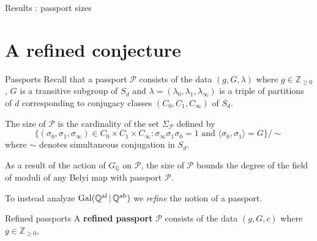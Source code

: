 \documentclass[xcolor=dvipsnames]{beamer}
\theoremstyle{plain}
\newcommand{\QQ}{\mathbb Q}
\newcommand{\ZZ}{\mathbb Z}
\newcommand{\QQal}{{\mathbb Q}^{\textup{al}}}
\newcommand{\QQab}{{\mathbb Q}^{\textup{ab}}}
\DeclareMathOperator{\Gal}{Gal}
\begin{document}
{\begin{frame}[fragile]{Results : passport sizes}
\begin{figure}[ht]
      \end{figure}
    \end{frame}
  }
  \section{A refined conjecture}{
    \begin{frame}{Passports}
      Recall that a passport $\mathcal{P}$
      consists of the data
      $(g,G,\lambda)$
      where $g\in\ZZ_{\geq 0}$,
      $G$ is a transitive subgroup of $S_d$
      and $\lambda = (\lambda_0,\lambda_1,\lambda_\infty)$
      is a triple of partitions of $d$
      corresponding to conjugacy classes $(C_0,C_1,C_\infty)$
      of $S_d$.
      \pause\par
      The size of
      $\mathcal{P}$ is the cardinality of the
      set
      $\Sigma_\mathcal{P}$
      defined by
      \[
        \Big\{
          (\sigma_0,\sigma_1,\sigma_\infty)\in C_0\times C_1\times C_\infty :
          \sigma_\infty\sigma_1\sigma_0=1
          \text{ and }
          \langle\sigma_0,\sigma_1\rangle=G
        \Big\}/\!\!\sim
      \]
      where $\sim$ denotes simultaneous conjugation in $S_d$.
      \pause\par
      As a result of the action of
      $G_\QQ$ on $\mathcal{P}$,
      the size of $\mathcal{P}$ bounds the degree of the field
      of moduli of any Belyi map with passport
      $\mathcal{P}$.
      \pause\par
      To instead analyze
      $\Gal(\QQal\,|\,\QQab)$
      we \emph{refine} the notion of a passport.
    \end{frame}
    \begin{frame}{Refined passports}
      A \textbf{refined passport} $\mathscr{P}$
      consists of the data
      $(g,G,c)$
      where $g\in\ZZ_{\geq 0}$,

\end{frame}}
\end{document}
